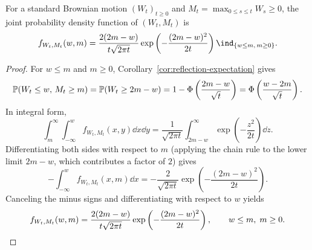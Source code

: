 \begin{lemma}\label{lem:joint-density-bm-max}
    For a standard Brownian motion $(W_t)_{t \ge 0}$ and $M_t = \max_{0 \le s \le t} W_s \ge 0$, the joint probability density function of $(W_t, M_t)$ is
    \[
    f_{W_t, M_t}(w, m) = \frac{2(2m - w)}{t\sqrt{2\pi t}}\exp\left(-\frac{(2m - w)^2}{2t}\right)\ind_{\{w \le m,\, m \ge 0\}}.
    \]
\end{lemma}
\begin{proof}
    For $w \le m$ and $m \ge 0$, Corollary~\ref{cor:reflection-expectation} gives
    \[
    \mathbb{P}(W_t \le w,\, M_t \ge m) = \mathbb{P}(W_t \ge 2m - w) = 1 - \Phi\left(\frac{2m - w}{\sqrt{t}}\right) = \Phi\left(\frac{w - 2m}{\sqrt{t}}\right).
    \]
    In integral form,
    \[
    \int_m^\infty \int_{-\infty}^w f_{W_t, M_t}(x, y)\dd x\dd y = \frac{1}{\sqrt{2\pi t}}\int_{2m - w}^\infty \exp\left(-\frac{z^2}{2t}\right)\dd z.
    \]
    Differentiating both sides with respect to $m$ (applying the chain rule to the lower limit $2m - w$, which contributes a factor of $2$) gives
    \[
    -\int_{-\infty}^w f_{W_t, M_t}(x, m)\dd x = -\frac{2}{\sqrt{2\pi t}}\exp\left(-\frac{(2m - w)^2}{2t}\right).
    \]
    Canceling the minus signs and differentiating with respect to $w$ yields
    \[
    f_{W_t, M_t}(w, m) = \frac{2(2m - w)}{t\sqrt{2\pi t}}\exp\left(-\frac{(2m - w)^2}{2t}\right), \qquad w \le m,\; m \ge 0. \qedhere
    \]
\end{proof}

